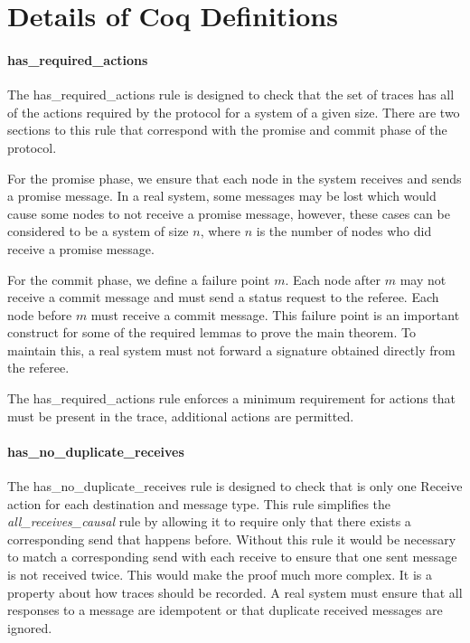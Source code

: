 \documentclass[runningheads]{llncs}
\begin{document}
\section{Details of Coq Definitions}\label{apdx:coq_detail}

\paragraph{has\_required\_actions}
The has\_required\_actions rule is designed to check that the set of traces has all of the actions required by the protocol for a system of a given size. There are two sections to this rule that correspond with the promise and commit phase of the protocol. 

For the promise phase, we ensure that each node in the system receives and sends a promise message. In a real system, some messages may be lost which would cause some nodes to not receive a promise message, however, these cases can be considered to be a system of size $n$, where $n$ is the number of nodes who did receive a promise message. 

For the commit phase, we define a failure point $m$. Each node after $m$ may not receive a commit message and must send a status request to the referee. Each node before $m$ must receive a commit message. This failure point is an important construct for some of the required lemmas to prove the main theorem. To maintain this, a real system must not forward a signature obtained directly from the referee. 

The has\_required\_actions rule enforces a minimum requirement for actions that must be present in the trace, additional actions are permitted.

\paragraph{has\_no\_duplicate\_receives}
The has\_no\_duplicate\_receives rule is designed to check that is only one Receive action for each destination and message type. This rule simplifies the \emph{all\_receives\_causal} rule by allowing it to require only that there exists a corresponding send that happens before. Without this rule it would be necessary to match a corresponding send with each receive to ensure that one sent message is not received twice. This would make the proof much more complex. It is a property about how traces should be recorded. A real system must ensure that all responses to a message are idempotent or that duplicate received messages are ignored. 
\end{document}
